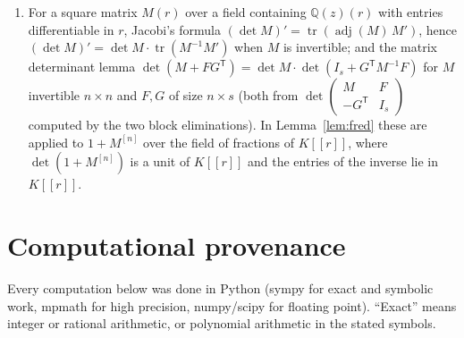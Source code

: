 \documentclass[11pt]{article}
\theoremstyle{definition}
\theoremstyle{remark}
\newcommand{\tr}{\operatorname{tr}}
\begin{document}
\begin{enumerate}[label=(H\arabic*),leftmargin=3em]
\item \label{H:jacobi} For a square matrix $M(r)$ over a field containing $\mathbb Q(z)(r)$ with entries differentiable in $r$, Jacobi's formula $(\det M)'=\tr(\operatorname{adj}(M)\,M')$, hence $(\det M)'=\det M\cdot\tr(M^{-1}M')$ when $M$ is invertible; and the matrix determinant lemma $\det(M+FG^{\mathsf T})=\det M\cdot\det(I_s+G^{\mathsf T}M^{-1}F)$ for $M$ invertible $n\times n$ and $F,G$ of size $n\times s$ (both from $\det\begin{pmatrix}M&F\\-G^{\mathsf T}&I_s\end{pmatrix}$ computed by the two block eliminations). In Lemma~\ref{lem:fred} these are applied to $1+M^{[n]}$ over the field of fractions of $K[[r]]$, where $\det(1+M^{[n]})$ is a unit of $K[[r]]$ and the entries of the inverse lie in $K[[r]]$.
\end{enumerate}

\section{Computational provenance}\label{app:prov}

Every computation below was done in Python (sympy for exact and symbolic work, mpmath for high precision, numpy/scipy for floating point). ``Exact'' means integer or rational arithmetic, or polynomial arithmetic in the stated symbols.
\end{document}
